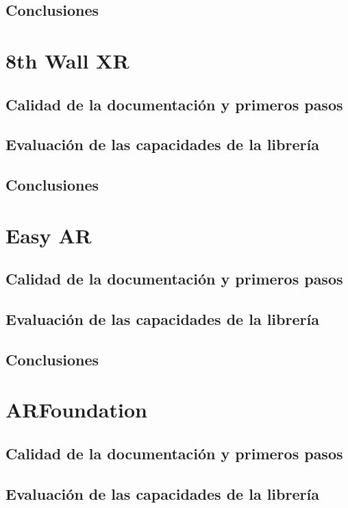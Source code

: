\subsection{Conclusiones}
\lipsum[1]

\section{8th Wall XR}
\subsection{Calidad de la documentación y primeros pasos}
\lipsum[1]
\subsection{Evaluación de las capacidades de la librería}
\lipsum[1]
\subsection{Conclusiones}
\lipsum[1]

\section{Easy AR}
\subsection{Calidad de la documentación y primeros pasos}
\lipsum[1]
\subsection{Evaluación de las capacidades de la librería}
\lipsum[1]
\subsection{Conclusiones}
\lipsum[1]

\section{ARFoundation}
\subsection{Calidad de la documentación y primeros pasos}
\lipsum[1]
\subsection{Evaluación de las capacidades de la librería}
\lipsum[1]
